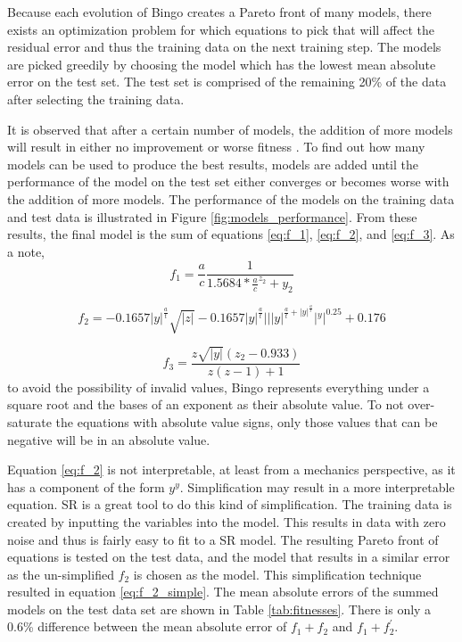 Because each evolution of Bingo creates a Pareto front of many models, there
exists an optimization problem for which equations to pick that will affect the
residual error and thus the training data on the next training step. The models
are picked greedily by choosing the model which has the lowest mean absolute
error on the test set. The test set is comprised of the remaining 20\% of the
data after selecting the training data.

It is observed that after a certain number of models, the addition of more models
will result in either no improvement or worse fitness
\cite{friedman2001greedy}. To find out how many models can be used to produce
the best results, models are added until the performance of the model on the
test set either converges or becomes worse with the addition of more models. The
performance of the models on the training data and test data is illustrated in
Figure \ref{fig:models_performance}. From these results, the final model is the
sum of equations \ref{eq:f_1},  \ref{eq:f_2}, and \ref{eq:f_3}. As a note,
\begin{equation} \label{eq:f_1}
f_1 = \frac{a}{c}\frac{1}{1.5684 * \frac{a}{c}^{z_2} + y_2}
\end{equation}

\begin{equation} \label{eq:f_2}
f_2 = -0.1657|y|^{\frac{a}{t}}\sqrt{|z|} - 0.1657|y|^{\frac{a}{t}}|||y|^{\frac{a}{t} + |y|^{\frac{a}{t}}}|^{y}|^{0.25} + 0.176
\end{equation}

\begin{equation} \label{eq:f_3}
f_3 = \frac{z\sqrt{|y|}(z_2 - 0.933)}{z(z-1) +1}
\end{equation}
to avoid the possibility of invalid values, Bingo represents everything under a
square root and the bases of an exponent as their absolute value. To not over-saturate the equations with absolute value signs, only those values that can be
negative will be in an absolute value.

Equation \ref{eq:f_2} is not interpretable, at least from a mechanics
perspective, as it has a component of the form $y^y$. Simplification may result
in a more interpretable equation. SR is a great tool to do this kind of simplification.
The training data is created by inputting the variables into the model. This
results in data with zero noise and thus is fairly easy to fit to a SR model.
The resulting Pareto front of equations is tested on the test data, and the model
that results in a similar error as the un-simplified $f_2$ is chosen as the model.
This simplification technique resulted in equation \ref{eq:f_2_simple}. The mean
absolute errors of the summed models on the test data set are shown in Table
\ref{tab:fitnesses}. There is only a 0.6\% difference between the mean absolute
error of $f_1 + f_2$ and $f_1 + f^{'}_{2}$.

